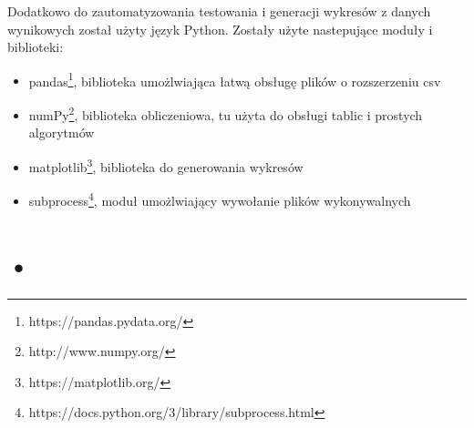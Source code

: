 \documentclass[12pt]{article}
\begin{document}
Dodatkowo do zautomatyzowania testowania i generacji wykresów z danych wynikowych został użyty język Python. Zostały użyte nastepujące moduły i biblioteki:

\begin{itemize}
	\item{pandas\footnote{https://pandas.pydata.org/}, biblioteka umożlwiająca łatwą obsługę plików o rozszerzeniu csv}
	\item{numPy\footnote{http://www.numpy.org/}, biblioteka obliczeniowa, tu użyta do obsługi tablic i prostych algorytmów} 
	\item{matplotlib\footnote{https://matplotlib.org/}, biblioteka do generowania wykresów}
	\item{subprocess\footnote{https://docs.python.org/3/library/subprocess.html}, moduł umożlwiający wywołanie plików wykonywalnych} 	
\end{itemize}


\section{•}
\end{document}

